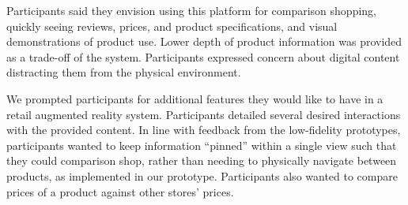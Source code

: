 Participants said they envision using this platform for comparison shopping, quickly seeing reviews, prices, and product specifications, and visual demonstrations of product use. 
Lower depth of product information was provided as a trade-off of the system. 
Participants expressed concern about digital content distracting them from the physical environment. 

We prompted participants for additional features they would like to have in a retail augmented reality system. Participants detailed several desired interactions with the provided content. In line with feedback from the low-fidelity prototypes, participants wanted to keep information ``pinned'' within a single view such that they could comparison shop, rather than needing to physically navigate between products, as implemented in our prototype. Participants also wanted to compare prices of a product against other stores' prices. 
